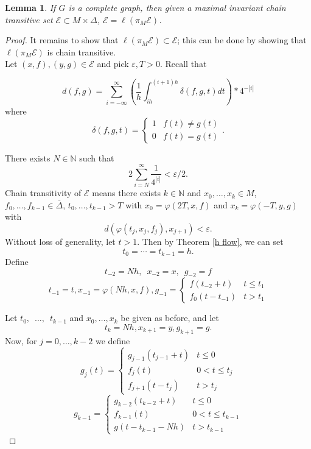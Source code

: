 \documentclass[11pt]{article}
\newtheorem{lem}[thm]{Lemma}
\begin{document}
\begin{lem}\label{complete graph}
If $G$ is a complete graph, then given a maximal invariant chain transitive set $\mathcal{E}\subset M\times\Delta$, $\mathcal{E}=\ell(\pi_M\mathcal{E})$.
\end{lem}
\begin{proof}
It remains to show that $\ell(\pi_M\mathcal{E})\subset\mathcal{E}$; this can be done by showing that $\ell(\pi_M\mathcal{E})$ is chain transitive.  \\
\indent Let $(x,f),(y,g)\in \mathcal{E}$ and pick $\varepsilon, T>0$.  Recall that 

$$d(f,g)=\displaystyle\sum_{i=-\infty}^{\infty}\left(\frac{1}{h}\displaystyle\int_{ih}^{(i+1)h}\delta(f,g,t)dt\right)*4^{-|i|}$$
 where
 $$\delta(f,g,t)=\left\{
     \begin{array}{lr}
       1 &  f(t)\not=g(t)\\
       0 &  f(t)=g(t)
     \end{array}
   \right. .$$


There exists $N\in\mathbb{N}$ such that 
$$2\displaystyle\sum_{i=N}^{\infty}\frac{1}{4^{|i|}}<\varepsilon/2.$$
Chain transitivity of $\mathcal{E}$ means there exists $k\in\mathbb{N}$ and $x_0,\ldots,x_k\in M$, $f_0,\ldots,f_{k-1}\in\overline{\Delta}$, $t_0,\ldots,t_{k-1}>T$ with $x_0=\varphi(2T,x,f)$ and $x_k=\varphi(-T,y,g)$ with 
$$d(\varphi(t_j,x_j,f_j),x_{j+1})<\varepsilon.$$
Without loss of generality, let $t>1$.  Then by Theorem \ref{h flow}, we can set
$$t_0=\cdots=t_{k-1}=h.$$
Define
$$t_{-2}=Nh, \,\,\,x_{-2}=x, \,\,\,g_{-2}=f$$
$$t_{-1}=t,x_{-1}=\varphi(Nh,x,f), g_{-1}= \left\{
     \begin{array}{lr}
       f(t_{-2}+t) &  t\leq t_1\\
       f_0(t-t_{-1}) &  t>t_1
     \end{array}
   \right.$$

Let $t_0,\,\,\,\ldots,\,\,\,t_{k-1}$ and $x_0,\ldots,x_k$ be given as before, and let 
$$t_k=Nh, x_{k+1}=y,g_{k+1}=g.$$
Now, for $j=0,\ldots,k-2$ we define
$$g_j(t)=\left\{
     \begin{array}{lr}
      g_{j-1}(t_{j-1}+t) &  t\leq 0\\
       f_j(t) & 0<t\leq t_j\\
       f_{j+1}(t-t_j) & t>t_j
    
     \end{array}
   \right.$$
   $$g_{k-1}=\left\{
     \begin{array}{lr}
       g_{k-2}(t_{k-2}+t) & t\leq0\\
       f_{k-1}(t)&  0<t\leq t_{k-1}\\
       g(t-t_{k-1}-Nh) & t>t_{k-1}
     \end{array}
   \right.$$
   

\end{proof}
\end{document}
